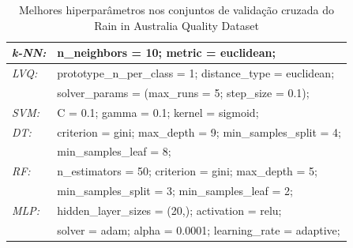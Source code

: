 \documentclass[journal]{IEEEtran}
\begin{document}
\begin{table}[h!]
	\caption{Melhores hiperparâmetros nos conjuntos de validação cruzada do Rain in Australia Quality Dataset}
	\label{tab:17}
	\begin{tabular}{ l l }
		\hline
		\textit{k-NN:} & n\_neighbors = 10; metric = euclidean;                     \\
		\hline
		\textit{LVQ:}  & prototype\_n\_per\_class = 1; distance\_type = euclidean;  \\  & solver\_params = (max\_runs = 5; step\_size = 0.1);\\
		\hline
		\textit{SVM:}  & C = 0.1; gamma = 0.1; kernel = sigmoid;                    \\
		\hline
		\textit{DT:}   & criterion = gini; max\_depth = 9; min\_samples\_split = 4; \\  & min\_samples\_leaf = 8;\\
		\hline
		\textit{RF:}   & n\_estimators = 50; criterion = gini; max\_depth = 5;      \\  & min\_samples\_split = 3; min\_samples\_leaf = 2;\\
		\hline
		\textit{MLP:}  & hidden\_layer\_sizes = (20,); activation = relu;           \\  & solver = adam; alpha = 0.0001; learning\_rate = adaptive;\\
		\hline
	\end{tabular}
\end{table}
\end{document}
